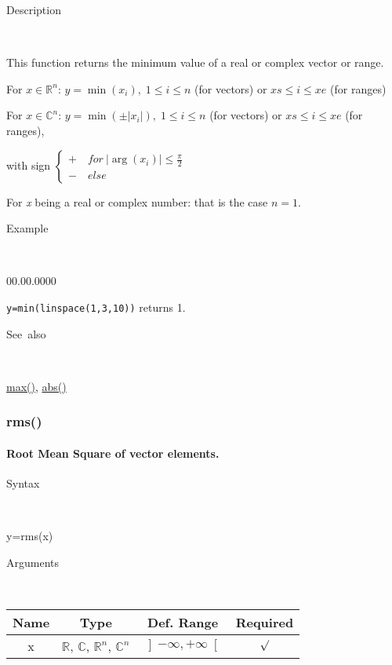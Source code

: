 \begin{description}
\item [Description]~
\end{description}
This function returns the minimum value of a real or complex vector
or range.

\medskip{}
For $x\in$$\mathbb{R}^{n}$: $y=$$\min\left(x_{i}\right),\;1\leq i\leq n$
(for vectors) or $xs\leq i\leq xe$ (for ranges)
\medskip{}

For $x\in\mathbb{C}^{n}$: $y=\min\left(\pm\left|x_{i}\right|\right),\;1\leq i\leq n$
(for vectors) or $xs\leq i\leq xe$ (for ranges),

with sign $\left\{ \begin{array}{l}
+\quad for\:\left|\arg\left(x_{i}\right)\right|\leq\frac{\pi}{2}\\
-\quad else\end{array}\right.$
\medskip{}

\noindent For \textit{x} being a real or complex number: that is the
case $n=1$.

\begin{description}
\item [Example]~
\end{description}
\begin{lyxlist}{00.00.0000}
\item [\texttt{y=min(linspace(1,3,10))}]returns 1.
\end{lyxlist}
\begin{description}
\item [See~also]~
\end{description}
\textcolor{blue}{\hyperlink{max}{max()}}\textcolor{black}{,} \textcolor{blue}{\hyperlink{abs}{abs()}}


\newpage
\subsubsection*{\hypertarget{rms}{}{\Large rms()}}


\paragraph{\label{par:rms}Root Mean Square of vector elements.}

\begin{description}
\item [Syntax]~
\end{description}
y=rms(x)

\begin{description}
\item [Arguments]~
\end{description}
\begin{tabular}{|c|c|c|c|}
\hline 
Name&
Type&
Def. Range&
Required\tabularnewline
\hline
\hline 
x&
$\mathbb{R}$, $\mathbb{C}$, $\mathbb{R}^{n}$, $\mathbb{C}^{n}$&
$\left]-\infty,+\infty\right[$&
$\surd$\tabularnewline
\hline
\end{tabular}


